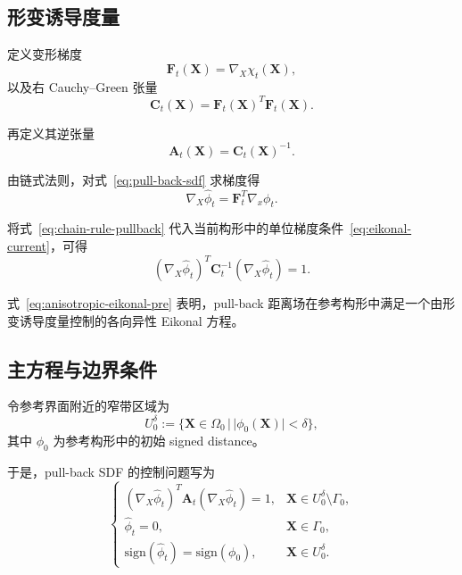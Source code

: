 \documentclass[12pt,a4paper]{ctexart}
\numberwithin{equation}{section}
\newcommand{\bA}{\bm{A}}
\newcommand{\bC}{\bm{C}}
\newcommand{\bF}{\bm{F}}
\newcommand{\bX}{\bm{X}}
\newcommand{\gradX}{\nabla_{\!X}}
\newcommand{\gradx}{\nabla_{\!x}}
\newcommand{\sign}{\mathrm{sign}}
\begin{document}
\subsection{形变诱导度量}

定义变形梯度
\begin{equation}
\bF_t(\bX)=\gradX \chi_t(\bX),
\end{equation}
以及右 Cauchy--Green 张量
\begin{equation}
\bC_t(\bX)=\bF_t(\bX)^T\bF_t(\bX).
\label{eq:right-cauchy-green}
\end{equation}

再定义其逆张量
\begin{equation}
\bA_t(\bX)=\bC_t(\bX)^{-1}.
\label{eq:A-def}
\end{equation}

由链式法则，对式~\eqref{eq:pull-back-sdf} 求梯度得
\begin{equation}
\gradX \widehat{\phi}_t = \bF_t^T\gradx \phi_t.
\label{eq:chain-rule-pullback}
\end{equation}

将式~\eqref{eq:chain-rule-pullback} 代入当前构形中的单位梯度条件~\eqref{eq:eikonal-current}，可得
\begin{equation}
\left(\gradX \widehat{\phi}_t\right)^T \bC_t^{-1}
\left(\gradX \widehat{\phi}_t\right)=1.
\label{eq:anisotropic-eikonal-pre}
\end{equation}

式~\eqref{eq:anisotropic-eikonal-pre} 表明，pull-back 距离场在参考构形中满足一个由形变诱导度量控制的各向异性 Eikonal 方程。

\subsection{主方程与边界条件}

令参考界面附近的窄带区域为
\begin{equation}
U_0^\delta := \{\bX\in\Omega_0\,|\,|\phi_0(\bX)|<\delta\},
\end{equation}
其中 $\phi_0$ 为参考构形中的初始 signed distance。

于是，pull-back SDF 的控制问题写为
\begin{equation}
\boxed{
\begin{cases}
\left(\gradX \widehat{\phi}_t\right)^T \bA_t\left(\gradX \widehat{\phi}_t\right)=1,
& \bX\in U_0^\delta\setminus \Gamma_0,\\[1mm]
\widehat{\phi}_t = 0,
& \bX\in\Gamma_0,\\[1mm]
\sign(\widehat{\phi}_t)=\sign(\phi_0),
& \bX\in U_0^\delta.
\end{cases}
}
\label{eq:anisotropic-eikonal-strong}
\end{equation}
\end{document}
